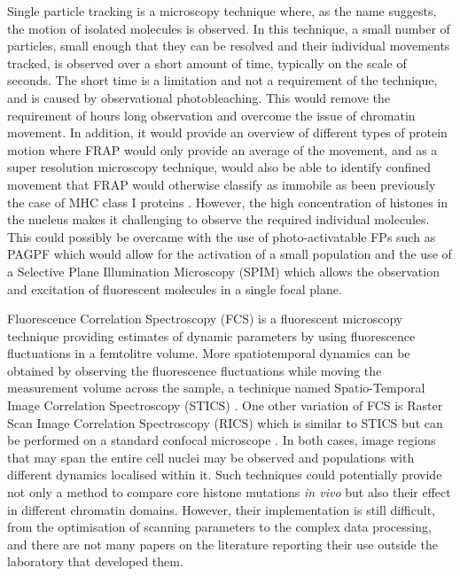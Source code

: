     Single particle tracking is a microscopy technique where, as the
    name suggests, the motion of isolated molecules is observed.  In
    this technique, a small number of particles, small enough that
    they can be resolved and their individual movements tracked, is
    observed over a short amount of time, typically on the scale of
    seconds.  The short time is a limitation and not a requirement of
    the technique, and is caused by observational photobleaching.
    This would remove the requirement of hours long observation and
    overcome the issue of chromatin movement.  In addition, it would
    provide an overview of different types of protein motion where
    FRAP would only provide an average of the movement, and as a super
    resolution microscopy technique, would also be able to identify
    confined movement that FRAP would otherwise classify as immobile
    as been previously the case of MHC class I proteins
    \citep{smith1999anomalous}.
    However, the high concentration of histones in the nucleus makes
    it challenging to observe the required individual molecules.  This
    could possibly be overcame with the use of photo-activatable FPs
    such as PAGPF which would allow for the activation of a small
    population and the use of a Selective Plane Illumination
    Microscopy (SPIM) which allows the observation and excitation of
    fluorescent molecules in a single focal plane.

    Fluorescence Correlation Spectroscopy (FCS) is a fluorescent
    microscopy technique providing estimates of dynamic parameters by
    using fluorescence fluctuations in a femtolitre volume.
    More spatiotemporal dynamics can be obtained by observing the
    fluorescence fluctuations while moving the measurement volume
    across the sample, a technique named Spatio-Temporal Image
    Correlation Spectroscopy (STICS) \citep{hebert2005spatiotemporal}.
    One other variation of FCS is Raster Scan Image Correlation
    Spectroscopy (RICS) which is similar to STICS but can be performed
    on a standard confocal microscope \citep{digman2005rics}.  In both
    cases, image regions that may span the entire cell nuclei may be
    observed and populations with different dynamics localised within
    it.  Such techniques
    could potentially provide not only a method to compare core
    histone mutations \textit{in vivo} but also their effect in
    different chromatin domains.
    However, their implementation is still difficult, from the
    optimisation of scanning parameters to the complex data
    processing, and there are not many papers on the literature
    reporting their use outside the laboratory that developed them.

